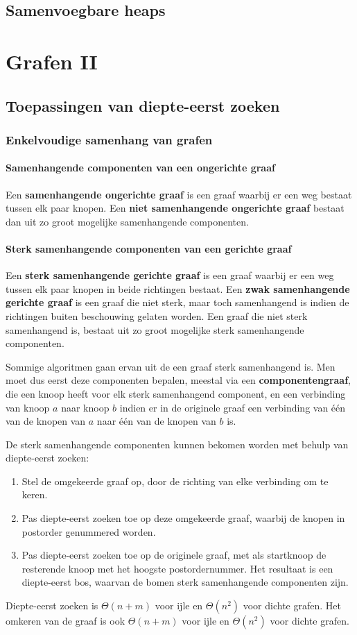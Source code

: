 \documentclass{report}
\begin{document}
\chapter{Samenvoegbare heaps}

\part{Grafen II}
\chapter{Toepassingen van diepte-eerst zoeken}
\section{Enkelvoudige samenhang van grafen}
\subsection{Samenhangende componenten van een ongerichte graaf}
Een \textbf{samenhangende ongerichte graaf} is een graaf waarbij er een weg bestaat tussen elk paar knopen. Een \textbf{niet samenhangende ongerichte graaf} bestaat dan uit zo groot mogelijke samenhangende componenten.

\subsection{Sterk samenhangende componenten van een gerichte graaf}
Een \textbf{sterk samenhangende gerichte graaf} is een graaf waarbij er een weg tussen elk paar knopen in beide richtingen bestaat. Een \textbf{zwak samenhangende gerichte graaf} is een graaf die niet sterk, maar toch samenhangend is indien de richtingen buiten beschouwing gelaten worden. Een graaf die niet sterk samenhangend is, bestaat uit zo groot mogelijke sterk samenhangende componenten. 

Sommige algoritmen gaan ervan uit de een graaf sterk samenhangend is. Men moet dus eerst deze componenten bepalen, meestal via een \textbf{componentengraaf}, die een knoop heeft voor elk sterk samenhangend component, en een verbinding van knoop $a$ naar knoop $b$ indien er in de originele graaf een verbinding van één van de knopen van $a$ naar één van de knopen van $b$ is. 

De sterk samenhangende componenten kunnen bekomen worden met behulp van diepte-eerst zoeken:
\begin{enumerate}
	\item Stel de omgekeerde graaf op, door de richting van elke verbinding om te keren.
	\item Pas diepte-eerst zoeken toe op deze omgekeerde graaf, waarbij de knopen in postorder genummered worden.
	\item Pas diepte-eerst zoeken toe op de originele graaf, met als startknoop de resterende knoop met het hoogste postordernummer. Het resultaat is een diepte-eerst bos, waarvan de bomen sterk samenhangende componenten zijn.
\end{enumerate}
Diepte-eerst zoeken is $\Theta(n + m)$ voor ijle en $\Theta(n^2)$ voor dichte grafen. Het omkeren van de graaf is ook $\Theta(n + m)$ voor ijle en $\Theta(n^2)$ voor dichte grafen.
\end{document}
